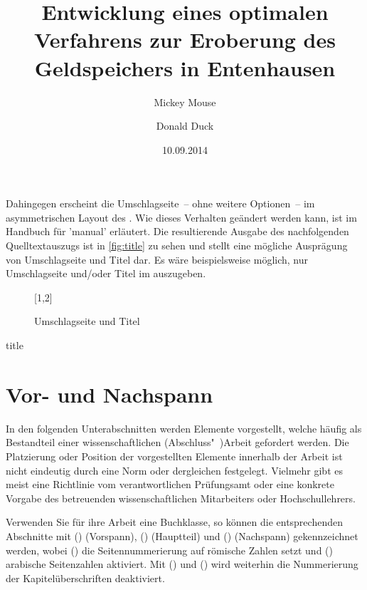 \documentclass[%
  english,ngerman,%
  cdgeometry=no,DIV=12,%
  automark,%
  listof=toc,%
]{tudscrartcl}
\begin{document}
Dahingegen erscheint die Umschlagseite~-- ohne weitere Optionen~-- im 
asymmetrischen Layout des \TUDCDs. Wie dieses Verhalten geändert werden kann, 
ist im Handbuch für 'manual' erläutert. Die resultierende 
Ausgabe des nachfolgenden Quelltextauszugs ist in \autoref{fig:title} zu sehen 
und stellt eine mögliche Ausprägung von Umschlagseite und Titel dar. Es wäre 
beispielsweise möglich, nur Umschlagseite und/oder Titel im \TUDCD auszugeben. 
%
\begin{figure}
[1,2]
\caption{Umschlagseite und Titel}
\label{fig:title}
\end{figure}

\begin{Trunk!}{title}
\title{%
  Entwicklung eines optimalen Verfahrens zur Eroberung des
  Geldspeichers in Entenhausen
}
\author{%
  Mickey Mouse%
\and%
  Donald Duck%
}
\date{10.09.2014}
\makecover
\maketitle

\end{Trunk!}


\section{Vor- und Nachspann}
In den folgenden Unterabschnitten werden Elemente vorgestellt, welche häufig 
als Bestandteil einer wissenschaftlichen (Abschluss"~)Arbeit gefordert werden. 
Die Platzierung oder Position der vorgestellten Elemente innerhalb der Arbeit 
ist nicht eindeutig durch eine Norm oder dergleichen festgelegt. Vielmehr gibt 
es meist eine Richtlinie vom verantwortlichen Prüfungsamt oder eine konkrete 
Vorgabe des betreuenden wissenschaftlichen Mitarbeiters oder Hochschullehrers.

Verwenden Sie für ihre Arbeit eine Buchklasse, so können die entsprechenden 
Abschnitte mit () (Vorspann), 
() (Hauptteil) und 
() (Nachspann) gekennzeichnet werden, 
wobei () die Seitennummerierung auf 
römische Zahlen setzt und () arabische 
Seitenzahlen aktiviert. Mit () und 
() wird weiterhin die Nummerierung der 
Kapitelüberschriften deaktiviert.
\end{document}
